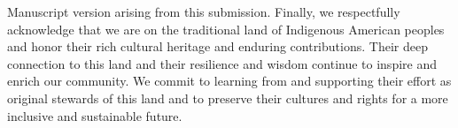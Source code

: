 Manuscript version arising from this submission. Finally, we respectfully acknowledge that we are on the traditional land of Indigenous American peoples and honor their rich cultural heritage and enduring contributions. Their deep connection to this land and their resilience and wisdom continue to inspire and enrich our community. We commit to learning from and supporting their effort as original stewards of this land and to preserve their cultures and rights for a more inclusive and sustainable future. 


